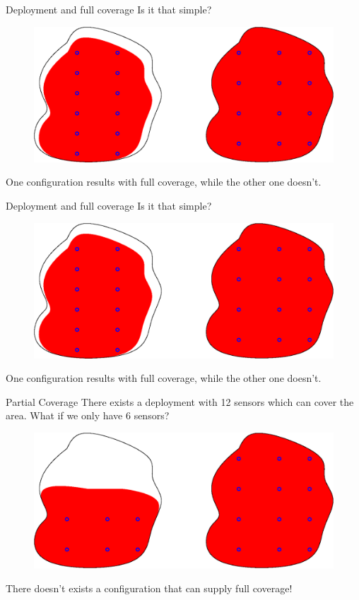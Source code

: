 \documentclass[t]{beamer}
\begin{document}
\begin{frame}[label=motivation7]{Deployment and full coverage}
Is it that simple?

\begin{figure}[b]
\includegraphics[scale=0.5]{motivation/deployment-configuration-partial-full-example.eps}
\end{figure}
One configuration results with full coverage, while the other one doesn't.
\end{frame}
\begin{frame}[label=motivation8]{Deployment and full coverage}
Is it that simple?

\begin{figure}[b]
\includegraphics[scale=0.5]{motivation/deployment-configuration-partial-full-example.eps}
\end{figure}
One configuration results with full coverage, while the other one doesn't.
\end{frame}
\begin{frame}[label=motivation9]{Partial Coverage}
There exists a deployment with 12 sensors which can cover the area. What if we only have 6 sensors?

\begin{figure}[b]
\includegraphics[scale=0.5]{motivation/deployment-configuration-partial-no-enough-sensors.eps}
\end{figure}
There doesn't exists a configuration that can supply full coverage!
\end{frame}
\end{document}
